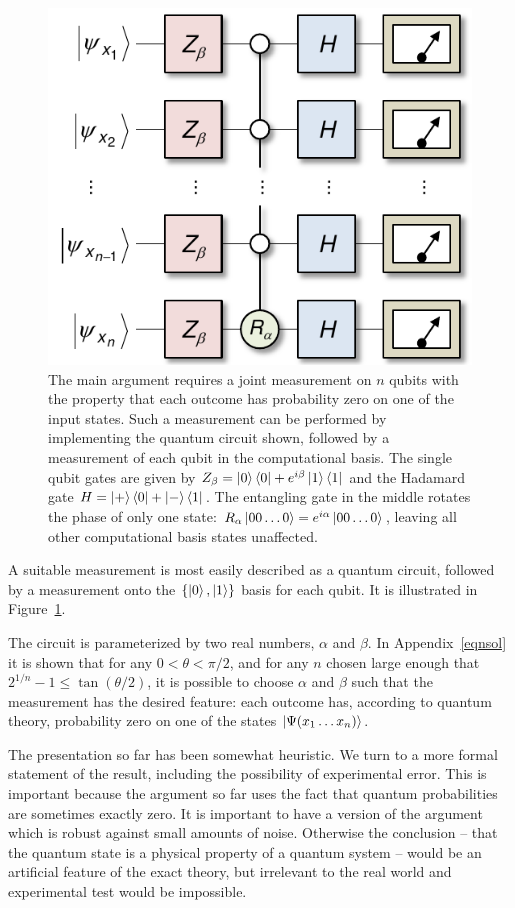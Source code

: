 \documentclass[amsmath,amssymb,superscriptaddress,twocolumn,pra]{revtex4-1}
\begin{document}
\begin{figure}
  \includegraphics[width=\columnwidth]{figs/nogofig3}
  \caption{The main argument requires a joint measurement on $n$ qubits with the property that each outcome has probability zero on one of the input states. Such a measurement can be performed by implementing the quantum circuit shown, followed by a measurement of each qubit in the computational basis. The single qubit gates are given by
$Z_\beta =\ket{0}\bra{0}+e^{i\beta}\ket{1}\bra{1}$
and the Hadamard gate
$H =\ket{+}\bra{0}+\ket{-}\bra{1}$.
The entangling gate in the middle rotates the phase of only one state:
$R_\alpha\ket{00\ldots0}= e^{i\alpha}\ket{00\ldots0}$, leaving all other computational basis states unaffected.}
  \label{fig3}
\end{figure}

A suitable measurement is most easily described as a quantum circuit, followed by a measurement onto the $\{\ket{0},\ket{1}\}$ basis for each qubit. It is illustrated in Figure~\ref{fig3}.

The circuit is parameterized by two real numbers, $\alpha$ and $\beta$. In Appendix~\ref{eqnsol} it is shown that for any $0<\theta<\pi/2$, and for any $n$ chosen large enough that  $2^{1/n} - 1 \leq \tan (\theta/2)$, it is possible to choose $\alpha$ and $\beta$ such that the measurement has the desired feature: each outcome has, according to quantum theory, probability zero on one of the states $\ket{\Psi(x_1\ldots x_n)}$.

The presentation so far has been somewhat heuristic. We turn to a more formal statement of the result, including the possibility of experimental error. This is important because the argument so far uses the fact that quantum probabilities are sometimes exactly zero. It is important to have a version of the argument which is robust against small amounts of noise. Otherwise the conclusion -- that the quantum state is a physical property of a quantum system -- would be an artificial feature of the exact theory, but irrelevant to the real world and experimental test would be impossible.
\end{document}
